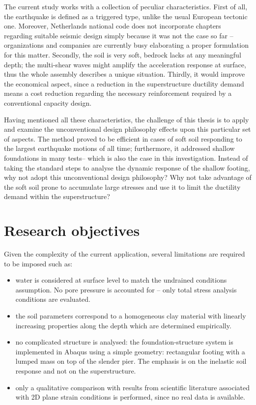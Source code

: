 \documentclass[11pt,a4paper]{report}
\begin{document}
The current study works with a collection of peculiar characteristics. First of all, the earthquake is defined as a triggered type, unlike the usual European tectonic one. Moreover, Netherlands national code does not incorporate chapters regarding suitable seismic design simply because it was not the case so far – organizations and companies are currently busy elaborating a proper formulation for this matter. Secondly, the soil is very soft, bedrock lacks at any meaningful depth; the multi-shear waves might amplify the acceleration response at surface, thus the whole assembly describes a unique situation. Thirdly, it would improve the economical aspect, since a reduction in the superstructure ductility demand means a cost reduction regarding the necessary reinforcement required by a conventional capacity design.

Having mentioned all these characteristics, the challenge of this thesis is to apply and examine the unconventional design philosophy effects upon this particular set of aspects. The method proved to be efficient in cases of soft soil responding to the largest earthquake motions of all time; furthermore, it addressed shallow foundations in many tests– which is also the case in this investigation. Instead of taking the standard steps to analyse the dynamic response of the shallow footing, why not adopt this unconventional design philosophy? Why not take advantage of the soft soil prone to accumulate large stresses and use it to limit the ductility demand within the superstructure? 


\section{Research objectives}
Given the complexity of the current application, several limitations are required to be imposed such as:
\begin{itemize}
	\item water is considered at surface level to match the undrained conditions assumption. No pore pressure is accounted for – only total stress analysis conditions are evaluated.
	\item the soil parameters correspond to a homogeneous clay material with linearly increasing properties along the depth which are determined empirically.
	\item no complicated structure is analysed: the foundation-structure system is implemented in Abaqus using a simple geometry: rectangular footing with a lumped mass on top of the slender pier. The emphasis is on the inelastic soil response and not on the superstructure.
	\item only a qualitative comparison with results from scientific literature associated with 2D plane strain conditions is performed, since no real data is available.
\end{itemize}
\end{document}
